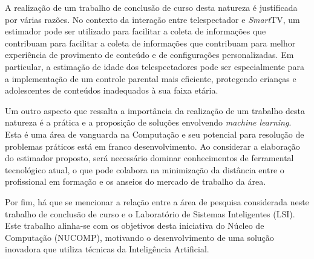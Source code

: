 A realização de um trabalho de conclusão de curso desta natureza é justificada por várias razões. No contexto da interação entre telespectador e \emph{Smart}TV, um estimador pode ser utilizado para facilitar a coleta de informações que contribuam para facilitar a coleta de informações que contribuam para melhor experiência de provimento de conteúdo e de configurações personalizadas. Em particular, a estimação de idade dos telespectadores pode ser especialmente para a implementação de um controle parental mais eficiente, protegendo crianças e adolescentes de conteúdos inadequados à sua faixa etária.

Um outro aspecto que ressalta a importância da realização de um trabalho desta natureza é a prática e a proposição de soluções envolvendo \emph{machine learning}. Esta é uma área de vanguarda na Computação e seu potencial para resolução de problemas práticos está em franco desenvolvimento. Ao considerar a elaboração do estimador proposto, será necessário dominar conhecimentos de  ferramental tecnológico atual, o que pode colabora na minimização da distância entre o profissional em formação e os anseios do mercado de trabalho da área.

Por fim, há que se mencionar a relação entre a área de pesquisa considerada neste trabalho de conclusão de curso e o Laboratório de Sistemas Inteligentes (LSI). Este trabalho alinha-se com os objetivos desta iniciativa do Núcleo de Computação (NUCOMP), motivando o desenvolvimento de uma solução  inovadora que utiliza técnicas da Inteligência Artificial.
